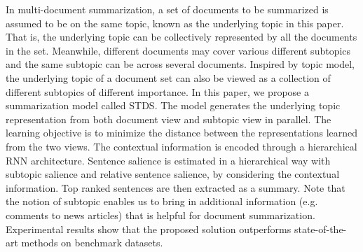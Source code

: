 In multi-document summarization, a set of documents to be summarized is assumed to be on the same topic, known as the underlying topic in this paper. That is, the underlying topic can be collectively represented by all the documents in the set. Meanwhile, different documents may cover various different subtopics and the same subtopic can be across several documents. Inspired by topic model, the underlying topic of a document set can also be viewed as a collection of different subtopics of different importance. In this paper, we propose a summarization model called STDS. The model generates the underlying topic representation from both document view and subtopic view in parallel. The learning objective is to minimize the distance between the representations learned from the two views. The contextual information is encoded through a hierarchical RNN architecture. Sentence salience is estimated in a hierarchical way with subtopic salience and relative sentence salience, by considering the contextual information. Top ranked  sentences are then extracted as a summary. Note that the notion of subtopic enables us to bring in additional information (e.g. comments to news articles) that is helpful for document summarization. Experimental results show that the proposed solution outperforms state-of-the-art methods on benchmark datasets.